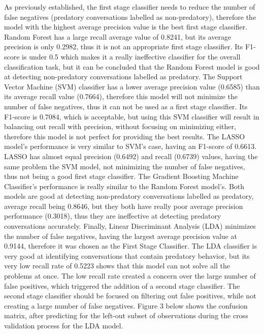 \documentclass[11pt]{article}
\begin{document}
As previously established, the first stage classifier needs to reduce the number of false negatives (predatory conversations labelled as non-predatory), therefore the model with the highest average precision value is the best first stage classifier. Random Forest has a large recall average value of 0.8241, but its average precision is only 0.2982, thus it is not an appropriate first stage classifier. Its F1-score is under 0.5 which makes it a really ineffective classifier for the overall classification task, but it can be concluded that the Random Forest model is good at detecting non-predatory conversations labelled as predatory. The Support Vector Machine (SVM) classifier has a lower average precision value (0.6585) than its average recall value (0.7664), therefore this model will not minimize the number of false negatives, thus it can not be used as a first stage classifier. Its F1-score is 0.7084, which is acceptable, but using this SVM classifier will result in balancing out recall with precision, without focusing on minimizing either, therefore this model is not perfect for providing the best results. The LASSO model's performance is very similar to SVM's case, having an F1-score of 0.6613. LASSO has almost equal precision (0.6492) and recall (0.6739) values, having the same problem the SVM model,  not minimizing the number of false negatives, thus not being a good first stage classifier. The Gradient Boosting Machine Classifier's performance is really similar to the Random Forest model's. Both models are good at detecting non-predatory conversations labelled as predatory, average recall being 0.8646, but they both have really poor average precision performance (0.3018), thus they are ineffective at detecting predatory conversations accurately. Finally, Linear Discriminant Analysis (LDA) minimizes the number of false negatives, having the largest average precision value at 0.9144, therefore it was chosen as the First Stage Classifier. The LDA classifier is very good at identifying conversations that contain predatory behavior, but its very low recall rate of 0.5223 shows that this model can not solve all the problems at once. The low recall rate created a concern over the large number of false positives, which triggered the addition of a second stage classifier. The second stage classifier should be focused on filtering out false positives, while not creating a large number of false negatives. Figure 3 below shows the confusion matrix, after predicting for the left-out subset of observations during the cross validation process for the LDA model.
\end{document}
